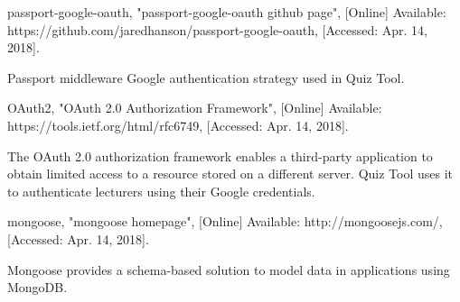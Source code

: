 \documentclass[11pt,a4paper]{report}
\begin{document}
\begin{thebibliography}{1}
 passport-google-oauth, "passport-google-oauth github page", [Online] Available: https://github.com/jaredhanson/passport-google-oauth, [Accessed: Apr. 14, 2018].

  Passport middleware Google authentication strategy used in Quiz Tool.

 OAuth2, "OAuth 2.0 Authorization Framework", [Online] Available: https://tools.ietf.org/html/rfc6749, [Accessed: Apr. 14, 2018].

  The OAuth 2.0 authorization framework enables a third-party application to obtain limited access to a resource stored on a
  different server. Quiz Tool uses it to authenticate lecturers using their Google credentials.

 mongoose, "mongoose homepage", [Online] Available: http://mongoosejs.com/, [Accessed: Apr. 14, 2018].

    Mongoose provides a schema-based solution to model data in applications using MongoDB.

\end{thebibliography}
\end{document}
